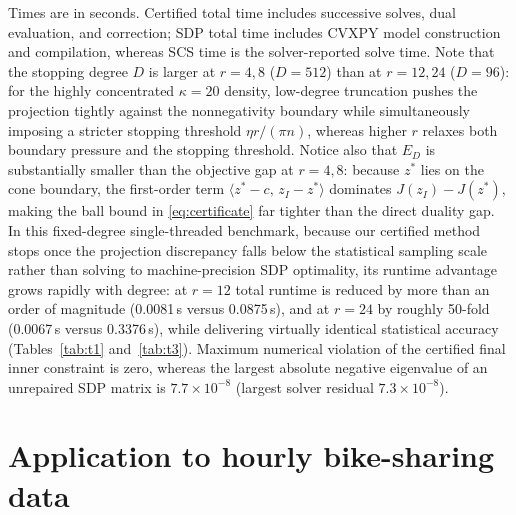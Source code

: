 Times are in seconds. Certified total time includes successive solves, dual evaluation, and correction; SDP total time includes CVXPY model construction and compilation, whereas SCS time is the solver-reported solve time. Note that the stopping degree \(D\) is larger at \(r=4,8\) (\(D=512\)) than at \(r=12,24\) (\(D=96\)): for the highly concentrated \(\kappa=20\) density, low-degree truncation pushes the projection tightly against the nonnegativity boundary while simultaneously imposing a stricter stopping threshold \(\eta r/(\pi n)\), whereas higher \(r\) relaxes both boundary pressure and the stopping threshold. Notice also that \(E_D\) is substantially smaller than the objective gap at \(r=4,8\): because \(z^*\) lies on the cone boundary, the first-order term \(\langle z^*-c,\,z_I-z^*\rangle\) dominates \(J(z_I)-J(z^*)\), making the ball bound in \eqref{eq:certificate} far tighter than the direct duality gap. In this fixed-degree single-threaded benchmark, because our certified method stops once the projection discrepancy falls below the statistical sampling scale rather than solving to machine-precision SDP optimality, its runtime advantage grows rapidly with degree: at \(r=12\) total runtime is reduced by more than an order of magnitude (0.0081\,s versus 0.0875\,s), and at \(r=24\) by roughly 50-fold (0.0067\,s versus 0.3376\,s), while delivering virtually identical statistical accuracy (Tables~\ref{tab:t1} and~\ref{tab:t3}). Maximum numerical violation of the certified final inner constraint is zero, whereas the largest absolute negative eigenvalue of an unrepaired SDP matrix is \(7.7\times10^{-8}\) (largest solver residual \(7.3\times10^{-8}\)).

\section{Application to hourly bike-sharing data}\label{sec:app}
